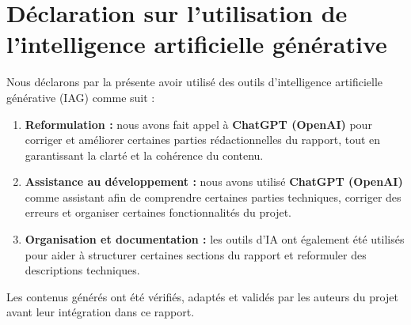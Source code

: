 \chapter*{Déclaration sur l’utilisation de l’intelligence artificielle générative}

Nous déclarons par la présente avoir utilisé des outils d’intelligence artificielle générative (IAG) comme suit :

\begin{enumerate}
	\item \textbf{Reformulation :} nous avons fait appel à \textbf{ChatGPT (OpenAI)} pour corriger et améliorer certaines parties rédactionnelles du rapport, tout en garantissant la clarté et la cohérence du contenu.
	
	\item \textbf{Assistance au développement :} nous avons utilisé \textbf{ChatGPT (OpenAI)} comme assistant afin de comprendre certaines parties techniques, corriger des erreurs et organiser certaines fonctionnalités du projet.
	
	\item \textbf{Organisation et documentation :} les outils d’IA ont également été utilisés pour aider à structurer certaines sections du rapport et reformuler des descriptions techniques.
\end{enumerate}

Les contenus générés ont été vérifiés, adaptés et validés par les auteurs du projet avant leur intégration dans ce rapport.